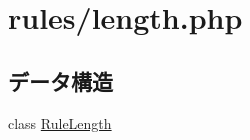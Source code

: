 \hypertarget{length_8php}{
\section{rules/length.php}
\label{length_8php}
}
\subsection*{データ構造}
\begin{DoxyCompactItemize}
\item 
class \hyperlink{class_rule_length}{\-Rule\-Length}
\end{DoxyCompactItemize}
